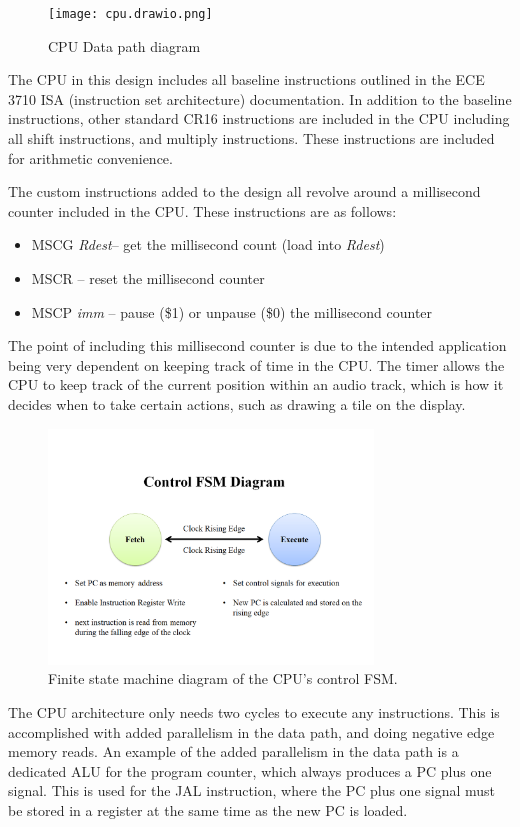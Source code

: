 \documentclass{subfile}
\begin{document}
\begin{figure}
  \centering 
  \texttt{[image: cpu.drawio.png]}
  \caption{CPU Data path diagram}
  \label{fig:datapath}
\end{figure}
  The CPU in this design includes all baseline instructions outlined in the ECE 3710 
  ISA (instruction set architecture) documentation.
  In addition to the baseline instructions, other standard CR16 instructions are 
  included in the CPU including all shift instructions, and multiply instructions. 
  These instructions are included for arithmetic convenience.

  The custom instructions added to the design all revolve around a millisecond counter 
  included in the CPU.
  These instructions are as follows: 
  \begin{itemize}
    \item MSCG \textit{Rdest}-- get the millisecond count (load into \textit{Rdest})
    \item MSCR -- reset the millisecond counter
    \item MSCP \textit{imm} -- pause (\$1) or unpause (\$0) the millisecond counter
  \end{itemize}

  The point of including this millisecond counter is due to the intended application being
  very dependent on keeping track of time in the CPU. 
  The timer allows the CPU to keep track of the current position within an audio track, 
  which is how it decides when to take certain actions, such as drawing a tile on 
  the display.

  \begin{figure}[h]
    \centering 
    \includegraphics[width=3.4in]{fsm diagram.PNG}
    \caption{Finite state machine diagram of the CPU's control FSM.}
    \label{fig:ctrl_fsm}
  \end{figure}

  The CPU architecture only needs two cycles to execute any instructions. 
  This is accomplished with added parallelism in the data path, and doing 
  negative edge memory reads. 
  An example of the added parallelism in the data path is a dedicated ALU for the 
  program counter, which always produces a PC plus one signal. 
  This is used for the JAL instruction, where the PC plus one signal must be stored 
  in a register at the same time as the new PC is loaded.
\end{document}
